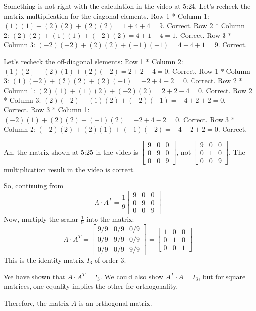 \documentclass{article}
\begin{document}
Something is not right with the calculation in the video at 5:24. Let's recheck the matrix multiplication for the diagonal elements.
Row 1 * Column 1: $(1)(1)+(2)(2)+(2)(2) = 1+4+4=9$. Correct.
Row 2 * Column 2: $(2)(2)+(1)(1)+(-2)(2) = 4+1-4=1$. Correct.
Row 3 * Column 3: $(-2)(-2)+(2)(2)+(-1)(-1) = 4+4+1=9$. Correct.

Let's recheck the off-diagonal elements:
Row 1 * Column 2: $(1)(2)+(2)(1)+(2)(-2) = 2+2-4=0$. Correct.
Row 1 * Column 3: $(1)(-2)+(2)(2)+(2)(-1) = -2+4-2=0$. Correct.
Row 2 * Column 1: $(2)(1)+(1)(2)+(-2)(2) = 2+2-4=0$. Correct.
Row 2 * Column 3: $(2)(-2)+(1)(2)+(-2)(-1) = -4+2+2=0$. Correct.
Row 3 * Column 1: $(-2)(1)+(2)(2)+(-1)(2) = -2+4-2=0$. Correct.
Row 3 * Column 2: $(-2)(2)+(2)(1)+(-1)(-2) = -4+2+2=0$. Correct.

Ah, the matrix shown at 5:25 in the video is $\begin{bmatrix} 9 & 0 & 0 \\ 0 & 9 & 0 \\ 0 & 0 & 9 \end{bmatrix}$, not $\begin{bmatrix} 9 & 0 & 0 \\ 0 & 1 & 0 \\ 0 & 0 & 9 \end{bmatrix}$. The multiplication result in the video is correct.

So, continuing from:
\[ A \cdot A^T = \frac{1}{9} \begin{bmatrix} 9 & 0 & 0 \\ 0 & 9 & 0 \\ 0 & 0 & 9 \end{bmatrix} \]
Now, multiply the scalar $\frac{1}{9}$ into the matrix:
\[ A \cdot A^T = \begin{bmatrix} 9/9 & 0/9 & 0/9 \\ 0/9 & 9/9 & 0/9 \\ 0/9 & 0/9 & 9/9 \end{bmatrix} = \begin{bmatrix} 1 & 0 & 0 \\ 0 & 1 & 0 \\ 0 & 0 & 1 \end{bmatrix} \]
This is the identity matrix $I_3$ of order 3.

We have shown that $A \cdot A^T = I_3$. We could also show $A^T \cdot A = I_3$, but for square matrices, one equality implies the other for orthogonality.

Therefore, the matrix $A$ is an orthogonal matrix.
\end{document}
